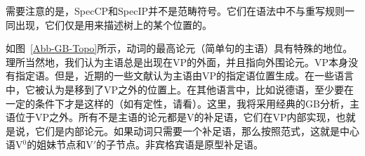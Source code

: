 需要注意的是，SpecCP和SpecIP并不是范畴符号。它们在语法中不与重写规则一同出现，它们仅是用来描述树上的某个位置的。

如图~\ref{Abb-GB-Topo}所示，动词的最高论元（简单句的主语）具有特殊的地位。理所当然地，我们认为主语总是出现在VP的外面，并且指向外围论元。VP本身没有指定语。但是，近期的一些文献认为主语由VP的指定语位置生成\citep{FS86a-u,KS91a-u}。在一些语言中，它被认为是移到了VP之外的位置上。在其他语言中，比如说德语，至少要在一定的条件下才是这样的（如有定性，请看\citealp{Diesing92a}）。这里，我将采用经典的GB分析，主语位于VP之外。所有不是主语的论元都是V的补足语，它们在VP内部实现，也就是说，它们是内部论元。如果动词只需要一个补足语，那么按照\xbar 范式，这就是中心语V$^0$的姐妹节点和V$'$的子节点。非宾格宾语是原型补足语。

